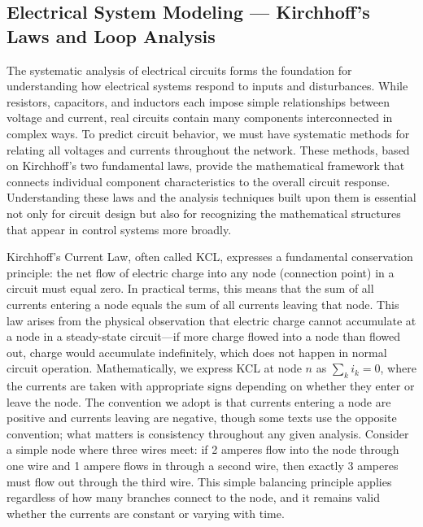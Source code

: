 \subsection{Electrical System Modeling — Kirchhoff's Laws and Loop Analysis}

The systematic analysis of electrical circuits forms the foundation for understanding how electrical systems respond to inputs and disturbances. While resistors, capacitors, and inductors each impose simple relationships between voltage and current, real circuits contain many components interconnected in complex ways. To predict circuit behavior, we must have systematic methods for relating all voltages and currents throughout the network. These methods, based on Kirchhoff's two fundamental laws, provide the mathematical framework that connects individual component characteristics to the overall circuit response. Understanding these laws and the analysis techniques built upon them is essential not only for circuit design but also for recognizing the mathematical structures that appear in control systems more broadly.

Kirchhoff's Current Law, often called KCL, expresses a fundamental conservation principle: the net flow of electric charge into any node (connection point) in a circuit must equal zero. In practical terms, this means that the sum of all currents entering a node equals the sum of all currents leaving that node. This law arises from the physical observation that electric charge cannot accumulate at a node in a steady-state circuit—if more charge flowed into a node than flowed out, charge would accumulate indefinitely, which does not happen in normal circuit operation. Mathematically, we express KCL at node $n$ as $\sum_{k} i_k = 0$, where the currents are taken with appropriate signs depending on whether they enter or leave the node. The convention we adopt is that currents entering a node are positive and currents leaving are negative, though some texts use the opposite convention; what matters is consistency throughout any given analysis. Consider a simple node where three wires meet: if 2 amperes flow into the node through one wire and 1 ampere flows in through a second wire, then exactly 3 amperes must flow out through the third wire. This simple balancing principle applies regardless of how many branches connect to the node, and it remains valid whether the currents are constant or varying with time.

